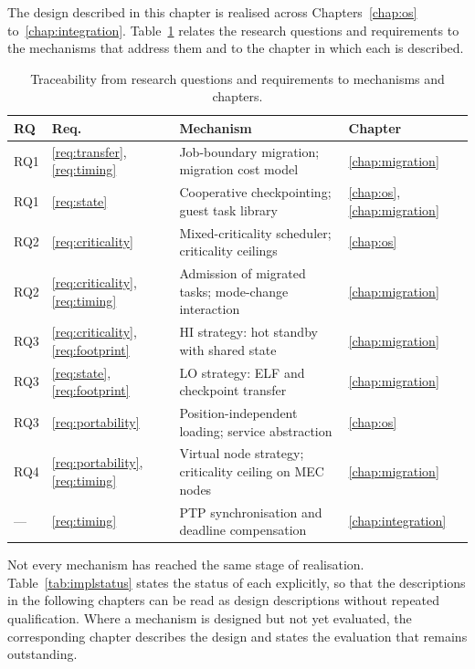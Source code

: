 The design described in this chapter is realised across
Chapters~\ref{chap:os} to~\ref{chap:integration}.
Table~\ref{tab:traceability} relates the research questions and requirements
to the mechanisms that address them and to the chapter in which each is
described.

\begin{table}[t]
	\centering
	\caption{Traceability from research questions and requirements to
		mechanisms and chapters.}
	\label{tab:traceability}
	\small
	\begin{tabular}{@{}llll@{}}
		\toprule
		RQ & Req. & Mechanism & Chapter \\
		\midrule
		RQ1 & \ref{req:transfer}, \ref{req:timing}
		& Job-boundary migration; migration cost model
		& \ref{chap:migration} \\
		RQ1 & \ref{req:state}
		& Cooperative checkpointing; guest task library
		& \ref{chap:os}, \ref{chap:migration} \\
		RQ2 & \ref{req:criticality}
		& Mixed-criticality scheduler; criticality ceilings
		& \ref{chap:os} \\
		RQ2 & \ref{req:criticality}, \ref{req:timing}
		& Admission of migrated tasks; mode-change interaction
		& \ref{chap:migration} \\
		RQ3 & \ref{req:criticality}, \ref{req:footprint}
		& \textsf{HI} strategy: hot standby with shared state
		& \ref{chap:migration} \\
		RQ3 & \ref{req:state}, \ref{req:footprint}
		& \textsf{LO} strategy: ELF and checkpoint transfer
		& \ref{chap:migration} \\
		RQ3 & \ref{req:portability}
		& Position-independent loading; service abstraction
		& \ref{chap:os} \\
		RQ4 & \ref{req:portability}, \ref{req:timing}
		& Virtual node strategy; criticality ceiling on MEC nodes
		& \ref{chap:migration} \\
		---  & \ref{req:timing}
		& PTP synchronisation and deadline compensation
		& \ref{chap:integration} \\
		\bottomrule
	\end{tabular}
\end{table}

Not every mechanism has reached the same stage of realisation.
Table~\ref{tab:implstatus} states the status of each explicitly, so that the
descriptions in the following chapters can be read as design descriptions
without repeated qualification. Where a mechanism is designed but not yet
evaluated, the corresponding chapter describes the design and states the
evaluation that remains outstanding.

